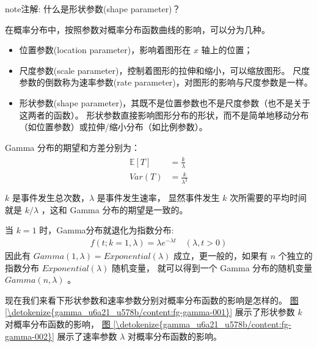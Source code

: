 \documentclass[letterpaper,10pt,english]{sphinxmanual}
\begin{document}
\begin{sphinxadmonition}{note}{注解:}
什么是形状参数(shape parameter)？

在概率分布中，按照参数对概率分布函数曲线的影响，可以分为几种。
\begin{itemize}
\item {} 
位置参数(location parameter)，影响着图形在 \(x\) 轴上的位置；

\item {} 
尺度参数(scale parameter)，控制着图形的拉伸和缩小，可以缩放图形。
尺度参数的倒数称为速率参数(rate parameter)，对图形的影响与尺度参数是一样。

\item {} 
形状参数(shape parameter)，其既不是位置参数也不是尺度参数（也不是关于这两者的函数）。
形状参数直接影响图形分布的形状，而不是简单地移动分布（如位置参数）或拉伸/缩小分布（如比例参数）。

\end{itemize}
\end{sphinxadmonition}

Gamma 分布的期望和方差分别为：
\begin{align}\label{equation:gamma模型/content:gamma模型/content:4}\!\begin{aligned}
\mathbb{E}[T] &= \frac{k}{\lambda}\\
Var(T) &=  \frac{k}{\lambda^2}\\
\end{aligned}\end{align}
\(k\) 是事件发生总次数，\(\lambda\) 是事件发生速率，
显然事件发生 \(k\) 次所需要的平均时间就是 \(k/\lambda\) ，这和 Gamma 分布的期望是一致的。

当 \(k=1\) 时，Gamma分布就退化为指数分布:
\begin{equation}\label{equation:gamma模型/content:gamma模型/content:5}
\begin{split}f(t;k=1,\lambda) =  \lambda e^{-\lambda t} \quad  (\lambda ,t > 0)\end{split}
\end{equation}
因此有 \(Gamma(1,\lambda) = Exponential(\lambda)\)
成立，更一般的，如果有 \(n\) 个独立的指数分布 \(Exponential(\lambda)\) 随机变量，
就可以得到一个 Gamma 分布的随机变量 \(Gamma(n,\lambda)\)
。

现在我们来看下形状参数和速率参数分别对概率分布函数的影响是怎样的。
\hyperref[\detokenize{gamma_u6a21_u578b/content:fg-gamma-001}]{图 \ref{\detokenize{gamma_u6a21_u578b/content:fg-gamma-001}}} 展示了形状参数 \(k\) 对概率分布函数的影响，
\hyperref[\detokenize{gamma_u6a21_u578b/content:fg-gamma-002}]{图 \ref{\detokenize{gamma_u6a21_u578b/content:fg-gamma-002}}} 展示了速率参数 \(\lambda\) 对概率分布函数的影响。
\end{document}
